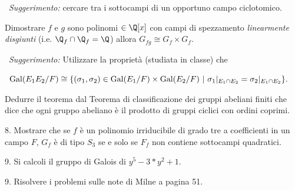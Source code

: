  \  \hfill {\it Suggerimento:} cercare tra i sottocampi di un opportuno
campo ciclotomico.

 Dimostrare $f$ e $g$ sono polinomi $\in\Q[x]$ con campi di spezzamento {\it linearmente
disgiunti} (i.e. $\Q_f\cap\Q_f=\Q$) allora $G_{fg}\cong G_f\times G_f.$

\ \hfill {\it Suggerimento:} Utilizzare la propriet\`{a} (studiata in classe) che

\ \hfill ${\rm Gal}(E_1E_2/F)\cong\{(\sigma_1,\sigma_2)\in{\rm Gal}(E_1/F)\times
{\rm Gal}(E_2/F)\ |\ \sigma_1|_{E_1\cap E_2}=\sigma_2|_{E_1\cap E_2}\}.$

 Dedurre il teorema dal Teorema di classificazione dei gruppi abeliani finiti
che dice che ogni gruppo abeliano \`{e} il prodotto di gruppi ciclici con ordini coprimi.
\bigskip


\item{8.} Mostrare che se $f$ \`{e} un polinomio irriducibile di grado tre a coefficienti
in un campo $F$, $G_f$ \`{e} di tipo $S_3$ se e solo se $F_f$ non contiene sottocampi quadratici.

\item{9.} Si calcoli il gruppo di Galois di $y^5 - 3*y^2 + 1$.

\item{9.} Risolvere i problemi sulle note di Milne a pagina 51.
\bye
